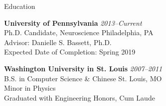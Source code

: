 \documentclass{resume} %
\begin{document}

\begin{rSection}{Education}

\textbf{University of Pennsylvania} \hfill \emph{2013--Current} \\
Ph.D. Candidate, Neuroscience \hfill Philadelphia, PA \\
Advisor: Danielle S. Bassett, Ph.D. \\
Expected Date of Completion: Spring 2019

\textbf{Washington University in St. Louis} \hfill \emph{2007--2011} \\
B.S. in Computer Science \& Chinese \hfill St. Louis, MO \\
Minor in Physics \\
Graduated with Engineering Honors, Cum Laude

\end{rSection}

\end{document}
